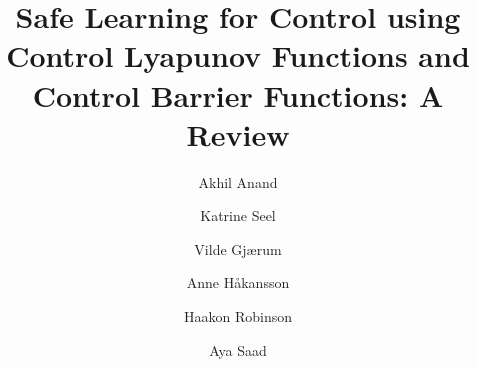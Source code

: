 \documentclass[3p,times,procedia]{elsarticle}
\begin{document}
\begin{frontmatter}



%

\title{Safe Learning for Control using Control Lyapunov Functions and Control Barrier Functions: A Review }




\author[a]{Akhil Anand} 
\author[a]{Katrine Seel}
\author[a]{Vilde Gjærum}
\author[b]{Anne Håkansson}
\author[a]{Haakon Robinson}
\author[a]{Aya Saad}



\address[a]{Department of Engineering Cybernetics, Norwegian University of Science and Technology (NTNU), Trondheim, Norway}
\address[b]{Department of Computer Science, Arctic University of Norway (UIT), Tromsø, Norway}


\end{frontmatter}
\end{document}
